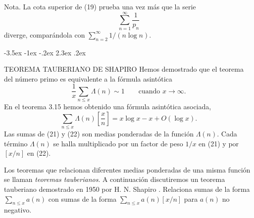 \documentclass[12pt,a4paper]{book}
\makeatletter
\renewcommand\section{\@startsection{section}{1}{\z@}%
  {-3.5ex \@plus -1ex \@minus -.2ex}%
  {2.3ex \@plus .2ex}%
  {\normalfont\Large\bfseries\raggedright}}
\makeatother
\begin{document}
    Nota. La cota superior de (19) prueba una vez más que la serie
    \begin{equation*}
        \sum_{n=1}^{\infty}\frac{1}{p_{n}}
    \end{equation*}
    diverge, comparándola con $\sum_{n=2}^{\infty}1/(n\log n)$.

    \section{TEOREMA TAUBERIANO DE SHAPIRO}
    Hemos demostrado que el teorema del número primo es equivalente a la fórmula
    asintótica
    \begin{equation}
        \frac{1}{x}\sum_{n\leq x}\Lambda(n)\sim1\qquad\text{cuando } x\to\infty.
    \end{equation}
    En el teorema 3.15 hemos obtenido una fórmula asintótica asociada,
    \begin{equation}
        \sum_{n\leq x}\Lambda(n)\left[\frac{x}{n}\right]=x\log x-x+O(\log x).
    \end{equation}
    Las sumas de (21) y (22) son medias ponderadas de la función $\Lambda(n)$. Cada
    término $\Lambda(n)$ se halla multiplicado por un factor de peso $1/x$ en (21) y
    por $[x/n]$ en (22).

    Los teoremas que relacionan diferentes medias ponderadas de una misma función se
    llaman \textit{teoremas tauberianos}. A continuación discutiremos un teorema
    tauberiano demostrado en 1950 por H. N. Shapiro \cite{shapiro1950}. Relaciona sumas de la forma
    $\sum_{n\leq x}a(n)$ con sumas de la forma $\sum_{n\leq x}a(n)[x/n]$ para $a(n)$ no
    negativo.
\end{document}
